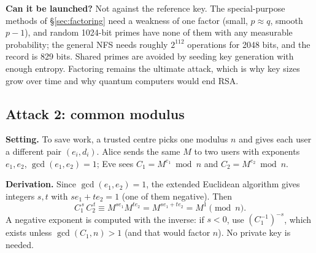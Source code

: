 \textbf{Can it be launched?} Not against the reference key. The special-purpose methods of \S\ref{sec:factoring} need a weakness of one factor (small, $p \approx q$, smooth $p - 1$), and random 1024-bit primes have none of them with any measurable probability; the general NFS needs roughly $2^{112}$ operations for 2048 bits, and the record is 829 bits. Shared primes are avoided by seeding key generation with enough entropy. Factoring remains the ultimate attack, which is why key sizes grow over time and why quantum computers would end RSA.

\subsection{Attack 2: common modulus \hot\new}

\textbf{Setting.} To save work, a trusted centre picks one modulus $n$ and gives each user a different pair $(e_i, d_i)$. Alice sends the same $M$ to two users with exponents $e_1, e_2$, $\gcd(e_1, e_2) = 1$; Eve sees $C_1 = M^{e_1} \bmod n$ and $C_2 = M^{e_2} \bmod n$.

\textbf{Derivation.} Since $\gcd(e_1, e_2) = 1$, the extended Euclidean algorithm gives integers $s, t$ with $s e_1 + t e_2 = 1$ (one of them negative). Then
\[
C_1^{\,s}\, C_2^{\,t} \equiv M^{s e_1} M^{t e_2} = M^{s e_1 + t e_2} = M^1 \pmod n .
\]
A negative exponent is computed with the inverse: if $s < 0$, use $(C_1^{-1})^{-s}$, which exists unless $\gcd(C_1, n) > 1$ (and that would factor $n$). No private key is needed.

